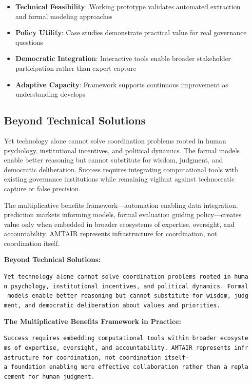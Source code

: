 \documentclass[
  11pt,
  letterpaper,
]{book}
\providecommand{\tightlist}{%
  \setlength{\itemsep}{0pt}\setlength{\parskip}{0pt}}
\begin{document}
\begin{itemize}
\tightlist
\item
  \textbf{Technical Feasibility}: Working prototype validates automated
  extraction and formal modeling approaches
\item
  \textbf{Policy Utility}: Case studies demonstrate practical value for
  real governance questions
\item
  \textbf{Democratic Integration}: Interactive tools enable broader
  stakeholder participation rather than expert capture
\item
  \textbf{Adaptive Capacity}: Framework supports continuous improvement
  as understanding develops
\end{itemize}

\subsection{Beyond Technical Solutions}\label{sec-beyond-technical}

Yet technology alone cannot solve coordination problems rooted in human
psychology, institutional incentives, and political dynamics. The formal
models enable better reasoning but cannot substitute for wisdom,
judgment, and democratic deliberation. Success requires integrating
computational tools with existing governance institutions while
remaining vigilant against technocratic capture or false precision.

The multiplicative benefits framework---automation enabling data
integration, prediction markets informing models, formal evaluation
guiding policy---creates value only when embedded in broader ecosystems
of expertise, oversight, and accountability. AMTAIR represents
infrastructure for coordination, not coordination itself.

\textbf{Beyond Technical Solutions:}

\texttt{Yet\ technology\ alone\ cannot\ solve\ coordination\ problems\ rooted\ in\ human\ psychology,\ institutional\ incentives,\ and\ political\ dynamics.\ Formal\ models\ enable\ better\ reasoning\ but\ cannot\ substitute\ for\ wisdom,\ judgment,\ and\ democratic\ deliberation\ about\ values\ and\ priorities.}

\textbf{The Multiplicative Benefits Framework in Practice:}

\texttt{Success\ requires\ embedding\ computational\ tools\ within\ broader\ ecosystems\ of\ expertise,\ oversight,\ and\ accountability.\ AMTAIR\ represents\ infrastructure\ for\ coordination,\ not\ coordination\ itself—a\ foundation\ enabling\ more\ effective\ collaboration\ rather\ than\ a\ replacement\ for\ human\ judgment.}
\end{document}
